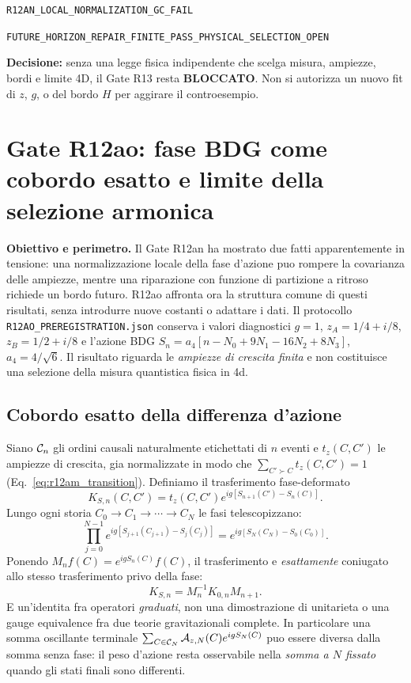 \documentclass[11pt,a4paper]{article}
\begin{document}
\begin{center}\small\texttt{R12AN\_LOCAL\_NORMALIZATION\_GC\_FAIL}\end{center}
\begin{center}\small\texttt{FUTURE\_HORIZON\_REPAIR\_FINITE\_PASS\_PHYSICAL\_SELECTION\_OPEN}\end{center}
\textbf{Decisione:} senza una legge fisica indipendente che scelga misura, ampiezze, bordi e limite 4D, il Gate R13 resta \textbf{BLOCCATO}. Non si autorizza un nuovo fit di $z$, $g$, o del bordo $H$ per aggirare il controesempio.

\section{Gate R12ao: fase BDG come cobordo esatto e limite della selezione armonica}
\label{sec:r12ao}

\textbf{Obiettivo e perimetro.} Il Gate R12an ha mostrato due fatti apparentemente in tensione: una normalizzazione locale della fase d'azione puo rompere la covarianza delle ampiezze, mentre una riparazione con funzione di partizione a ritroso richiede un bordo futuro. R12ao affronta ora la struttura comune di questi risultati, senza introdurre nuove costanti o adattare i dati. Il protocollo \texttt{R12AO\_PREREGISTRATION.json} conserva i valori diagnostici $g=1$, $z_A=1/4+i/8$, $z_B=1/2+i/8$ e l'azione BDG $S_n=a_4[n-N_0+9N_1-16N_2+8N_3]$, $a_4=4/\sqrt6$. Il risultato riguarda le \emph{ampiezze di crescita finita} e non costituisce una selezione della misura quantistica fisica in 4d.

\subsection{Cobordo esatto della differenza d'azione}
Siano ${\cal C}_n$ gli ordini causali naturalmente etichettati di $n$ eventi e $t_z(C,C')$ le ampiezze di crescita, gia normalizzate in modo che $\sum_{C'\succ C}t_z(C,C')=1$ (Eq.~\eqref{eq:r12am_transition}). Definiamo il trasferimento fase-deformato
\begin{equation}
 K_{S,n}(C,C')=t_z(C,C')e^{ig[S_{n+1}(C')-S_n(C)]}.
 \label{eq:r12ao_twist}
\end{equation}
Lungo ogni storia $C_0\to C_1\to\cdots\to C_N$ le fasi telescopizzano:
\begin{equation}
 \prod_{j=0}^{N-1}e^{ig[S_{j+1}(C_{j+1})-S_j(C_j)]}
 =e^{ig[S_N(C_N)-S_0(C_0)]}.
 \label{eq:r12ao_telescoping}
\end{equation}
Ponendo $M_nf(C)=e^{igS_n(C)}f(C)$, il trasferimento e \emph{esattamente} coniugato allo stesso trasferimento privo della fase:
\begin{equation}
 \boxed{K_{S,n}=M_n^{-1}K_{0,n}M_{n+1}}.
 \label{eq:r12ao_conjugacy}
\end{equation}
E un'identita fra operatori \emph{graduati}, non una dimostrazione di unitarieta o una gauge equivalence fra due teorie gravitazionali complete. In particolare una somma oscillante terminale $\sum_{C\in{\cal C}_N}{\cal A}_{z,N}(C)e^{igS_N(C)}$ puo essere diversa dalla somma senza fase: il peso d'azione resta osservabile nella \emph{somma a $N$ fissato} quando gli stati finali sono differenti.
\end{document}

